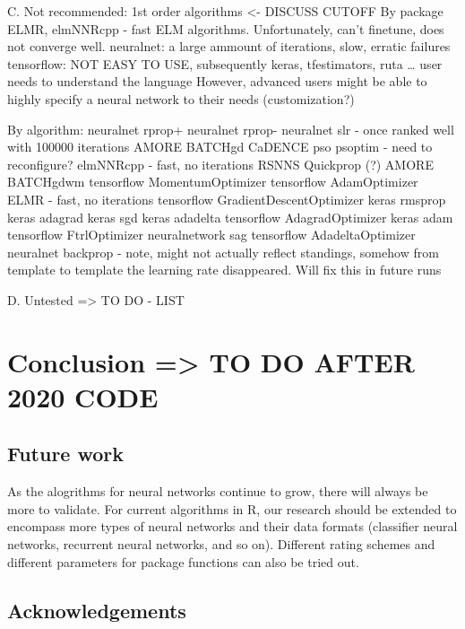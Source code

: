 C. Not recommended: 1st order algorithms \textless- DISCUSS CUTOFF By
package ELMR, elmNNRcpp - fast ELM algorithms. Unfortunately, can't
finetune, does not converge well. neuralnet: a large ammount of
iterations, slow, erratic failures tensorflow: NOT EASY TO USE,
subsequently keras, tfestimators, ruta \ldots{} user needs to understand
the language However, advanced users might be able to highly specify a
neural network to their needs (customization?)

By algorithm: neuralnet rprop+ neuralnet rprop- neuralnet slr - once
ranked well with 100000 iterations AMORE BATCHgd CaDENCE pso psoptim -
need to reconfigure? elmNNRcpp - fast, no iterations RSNNS Quickprop (?)
AMORE BATCHgdwm tensorflow MomentumOptimizer tensorflow AdamOptimizer
ELMR - fast, no iterations tensorflow GradientDescentOptimizer keras
rmsprop keras adagrad keras sgd keras adadelta tensorflow
AdagradOptimizer keras adam tensorflow FtrlOptimizer neuralnetwork sag
tensorflow AdadeltaOptimizer neuralnet backprop - note, might not
actually reflect standings, somehow from template to template the
learning rate disappeared. Will fix this in future runs

D. Untested =\textgreater{} TO DO - LIST

\hypertarget{conclusion-to-do-after-2020-code}{%
\section{Conclusion =\textgreater{} TO DO AFTER 2020
CODE}\label{conclusion-to-do-after-2020-code}}

\hypertarget{future-work}{%
\subsection{Future work}\label{future-work}}

As the alogrithms for neural networks continue to grow, there will
always be more to validate. For current algorithms in R, our research
should be extended to encompass more types of neural networks and their
data formats (classifier neural networks, recurrent neural networks, and
so on). Different rating schemes and different parameters for package
functions can also be tried out.

\hypertarget{acknowledgements}{%
\subsection{Acknowledgements}\label{acknowledgements}}


